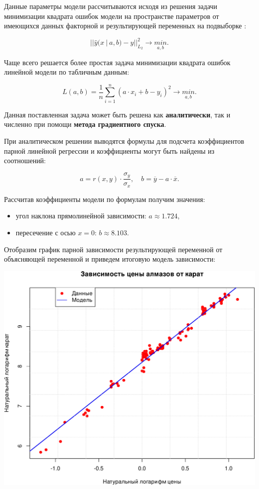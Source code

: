 \documentclass[
]{article}
\providecommand{\tightlist}{%
  \setlength{\itemsep}{0pt}\setlength{\parskip}{0pt}}
\begin{document}
Данные параметры модели рассчитываются исходя из решения задачи
минимизации квадрата ошибок модели на пространстве параметров от
имеющихся данных факторной и результирующей переменных на подвыборке :

\[
||\hat{y}(x\ |\ a,b) - y||_{L_2}^2 \to \underset{a, b}{min}.
\]

Чаще всего решается более простая задача минимизации квадрата ошибок
линейной модели по табличным данным:

\[
L(a, b) = \frac{1}{n} \sum \limits_{i=1}^{n}\left( a\cdot x_i + b - y_i  \right)^2 \to \underset{a,b}{min}.
\]

Данная поставленная задача может быть решена как \textbf{аналитически},
так и численно при помощи \textbf{метода градиентного спуска}.

При аналитическом решении выводятся формулы для подсчета коэффициентов
парной линейной регрессии и коэффициенты могут быть найдены из
соотношений:

\[
a = r(x, y) \cdot \frac{\sigma_y}{\sigma_x}, \quad b = \overline{y} - a\cdot \overline{x}.
\]

Рассчитав коэффициенты модели по формулам получим значения:

\begin{itemize}
\tightlist
\item
  угол наклона прямолинейной зависимости: \(a \approx 1.724\),
\item
  пересечение с осью \(x = 0\): \(b \approx 8.103\).
\end{itemize}

Отобразим график парной зависимости результирующей переменной от
объясняющей переменной и приведем итоговую модель зависимости:

\begin{center}\includegraphics[width=0.6\linewidth]{Prac5_files/figure-latex/unnamed-chunk-14-1} \end{center}
\end{document}
